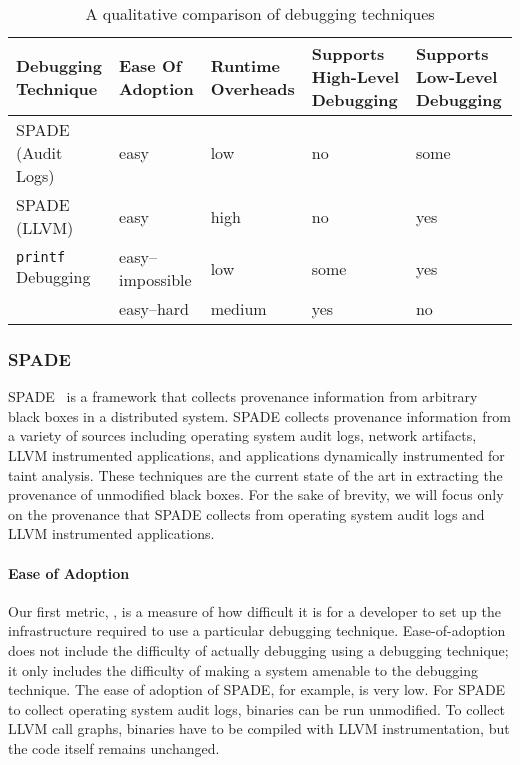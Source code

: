 \begin{table*}[t]
  \caption{A qualitative comparison of debugging techniques}
  \begin{tabular}{lllp{3cm}p{3cm}}
    \toprule
    Debugging Technique       & Ease Of Adoption & Runtime Overheads & Supports High-Level Debugging & Supports Low-Level Debugging \\\midrule
    SPADE (Audit Logs)        & easy             & low               & no                            & some \\
    SPADE (LLVM)              & easy             & high              & no                            & yes \\
    \texttt{printf} Debugging & easy--impossible & low               & some                          & yes \\
    \fluent{}                 & easy--hard       & medium            & yes                           & no \\
    \bottomrule
  \end{tabular}
\end{table*}

\subsubsection{SPADE}
SPADE~\cite{gehani2012spade} is a framework that collects provenance
information from arbitrary black boxes in a distributed system. SPADE collects
provenance information from a variety of sources including operating system
audit logs, network artifacts, LLVM instrumented applications, and applications
dynamically instrumented for taint analysis. These techniques are the current
state of the art in extracting the provenance of unmodified black boxes. For the
sake of brevity, we will focus only on the provenance that SPADE collects from
operating system audit logs and LLVM instrumented applications.

\paragraph{Ease of Adoption}
Our first metric, , is a measure of how difficult it
is for a developer to set up the infrastructure required to use a particular
debugging technique. Ease-of-adoption does not include the difficulty of
actually debugging using a debugging technique; it only includes the difficulty
of making a system amenable to the debugging technique.
%
The ease of adoption of SPADE, for example, is very low. For SPADE to collect
operating system audit logs, binaries can be run unmodified. To collect LLVM
call graphs, binaries have to be compiled with LLVM instrumentation, but the
code itself remains unchanged.


